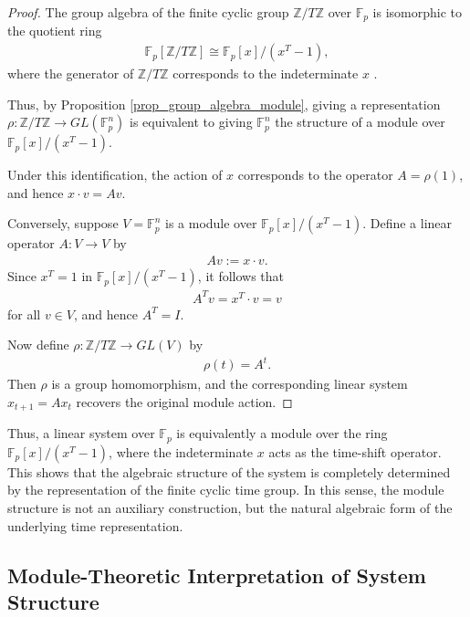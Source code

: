 \documentclass[letterpaper, 9pt, conference]{ieeeconf}
\begin{document}
\begin{proof}
The group algebra of the finite cyclic group
$\mathbb{Z}/T\mathbb{Z}$ over $\mathbb{F}_p$ is isomorphic to the quotient ring
\begin{eqnarray}
\mathbb{F}_p[\mathbb{Z}/T\mathbb{Z}] \cong \mathbb{F}_p[x]/(x^T - 1),
\end{eqnarray}
where the generator of $\mathbb{Z}/T\mathbb{Z}$ corresponds to the indeterminate
$x$ \cite{dummit_foote}.

Thus, by Proposition \ref{prop_group_algebra_module}, giving a representation
$\rho : \mathbb{Z}/T\mathbb{Z} \to GL(\mathbb{F}_p^n)$ is equivalent to giving
$\mathbb{F}_p^n$ the structure of a module over
$\mathbb{F}_p[x]/(x^T - 1)$.

Under this identification, the action of $x$ corresponds to the operator
$A = \rho(1)$, and hence $x \cdot v = Av$.

Conversely, suppose $V = \mathbb{F}_p^n$ is a module over
$\mathbb{F}_p[x]/(x^T - 1)$. Define a linear operator $A : V \to V$ by
\begin{eqnarray}
A v := x \cdot v.
\end{eqnarray}
Since $x^T = 1$ in $\mathbb{F}_p[x]/(x^T - 1)$, it follows that
\begin{eqnarray}
A^T v = x^T \cdot v = v
\end{eqnarray}
for all $v \in V$, and hence $A^T = I$.

Now define $\rho : \mathbb{Z}/T\mathbb{Z} \to GL(V)$ by
\begin{eqnarray}
\rho(t) = A^t.
\end{eqnarray}
Then $\rho$ is a group homomorphism, and the corresponding linear system
$x_{t+1} = Ax_t$ recovers the original module action.
\end{proof}

Thus, a linear system over $\mathbb{F}_p$ is equivalently a module over the
ring $\mathbb{F}_p[x]/(x^T - 1)$, where the indeterminate $x$ acts as the
time-shift operator. This shows that the algebraic structure of the system is
completely determined by the representation of the finite cyclic time group. In this sense, the module structure is not an auxiliary construction, but the natural algebraic form of the underlying time representation.

\subsection{Module-Theoretic Interpretation of System Structure}
\end{document}
